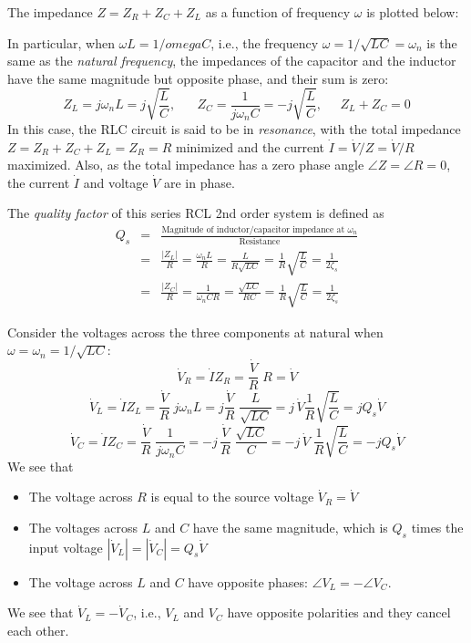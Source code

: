 \documentclass{article}
\begin{document}

The impedance $Z=Z_R+Z_C+Z_L$ as a function of frequency $\omega$ is
plotted below:


In particular, when $\omega L=1/omega C$, i.e., the frequency 
$\omega=1/\sqrt{LC}=\omega_n$ is the same as the {\em natural frequency}, 
the impedances of the capacitor and the inductor have the same magnitude 
but opposite phase, and their sum is zero:
\begin{equation}
  Z_L=j\omega_nL=j\sqrt{\frac{L}{C}},\;\;\;\;\;\;
  Z_C=\frac{1}{j\omega_nC}=-j\sqrt{\frac{L}{C}},\;\;\;\;\;
  Z_L+Z_C=0
\end{equation}
In this case, the RLC circuit is said to be in {\em resonance}, with
the total impedance $Z=Z_R+Z_C+Z_L=Z_R=R$ minimized and the current 
$\dot{I}=\dot{V}/Z=\dot{V}/R$ maximized. Also, as the total impedance 
has a zero phase angle $\angle Z=\angle R=0$, the current $\dot{I}$ and
voltage $\dot{V}$ are in phase. 

The {\em quality factor} of this series RCL 2nd order system is defined as
\begin{eqnarray}
  Q_s&=&
  \frac{\mbox{Magnitude of inductor/capacitor impedance at $\omega_n$}}
       {\mbox{Resistance}}
  \nonumber \\
  &=&\frac{|Z_L|}{R}=\frac{\omega_nL}{R}=\frac{L}{R\sqrt{LC}}
  =\frac{1}{R}\sqrt{\frac{L}{C}}=\frac{1}{2\zeta_s}
  \nonumber \\
  &=&\frac{|Z_C|}{R}=\frac{1}{\omega_nCR}=\frac{\sqrt{LC}}{RC}
  =\frac{1}{R}\sqrt{\frac{L}{C}}=\frac{1}{2\zeta_s}
\end{eqnarray}

Consider the voltages across the three components at 
natural when $\omega=\omega_n=1/\sqrt{LC}$:
\begin{equation}
  \dot{V}_R=\dot{I} Z_R =\frac{\dot{V}}{R} \;R=\dot{V}
\end{equation}
\begin{equation} 
  \dot{V}_L=\dot{I} Z_L=\frac{\dot{V}}{R}\;j\omega_n L
  =j\frac{\dot{V}}{R}\;\frac{L}{\sqrt{LC}}
  =j\,\dot{V} \frac{1}{R}\sqrt{\frac{L}{C}}=jQ_s\dot{V}	
\end{equation}
\begin{equation} 
  \dot{V}_C=\dot{I} Z_C=\frac{\dot{V}}{R}\;\frac{1}{j\omega_n C}
  =-j\,\frac{\dot{V}}{R}\;\frac{\sqrt{LC}}{C}
  =-j\,\dot{V}\;\frac{1}{R}\sqrt{\frac{L}{C}}=-jQ_s\dot{V}	
\end{equation}
We see that
\begin{itemize}
\item The voltage across $R$ is equal to the source voltage
  $\dot{V}_R=\dot{V}$
\item The voltages across $L$ and $C$ have the same magnitude, which 
  is $Q_s$ times the input voltage $|\dot{V}_L|=|\dot{V}_C|=Q_s\dot{V}$
\item The voltage across $L$ and $C$ have opposite phases: 
  $\angle V_L=-\angle V_C$.
\end{itemize}
We see that $\dot{V}_L=-\dot{V}_C$, i.e., $V_L$ and $V_C$ have 
opposite polarities and they cancel each other.
\end{document}
